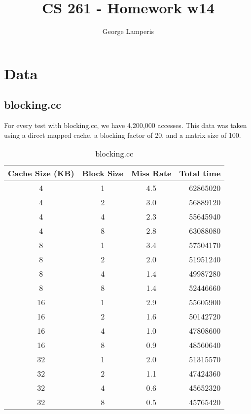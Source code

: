 \documentclass[letterpaper, 12pt, oneside]{memoir}
\title{CS 261 - Homework w14}
\author{George Lamperis}
\date{}
\begin{document}
\maketitle

\section{Data}

\subsection{blocking.cc}
For every test with blocking.cc, we have 4,200,000 accesses. This data 
was taken using a direct mapped cache, a blocking factor of 20, and a matrix
size of 100.

\begin{table}[H]
\centering
\begin{tabular}{c|c|c|r}
    Cache Size (KB)  & Block Size & Miss Rate & Total time \\ \hline 
    4  & 1 & 4.5    & 62865020 \\
    4  & 2 & 3.0    & 56889120 \\
    4  & 4 & 2.3    & 55645940 \\
    4  & 8 & 2.8    & 63088080 \\ \hline
    8  & 1 & 3.4    & 57504170 \\
    8  & 2 & 2.0    & 51951240 \\
    8  & 4 & 1.4    & 49987280 \\
    8  & 8 & 1.4    & 52446660 \\ \hline
    16 & 1 & 2.9    & 55605900 \\
    16 & 2 & 1.6    & 50142720 \\
    16 & 4 & 1.0    & 47808600 \\
    16 & 8 & 0.9    & 48560640 \\ \hline
    32 & 1 & 2.0    & 51315570 \\
    32 & 2 & 1.1    & 47424360 \\
    32 & 4 & 0.6    & 45652320 \\
    32 & 8 & 0.5    & 45765420 \\
\end{tabular}
\caption{blocking.cc}
\end{table}
\end{document}
